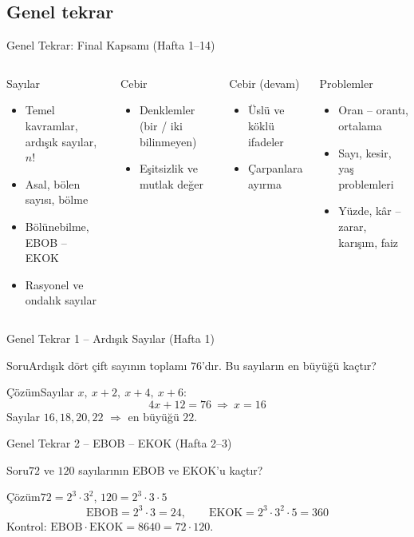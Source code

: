 \documentclass[aspectratio=169,11pt,handout]{beamer}
\newcommand{\soru}[3]{%
\begin{frame}{#1}
  \begin{block}{Soru}\large #2\end{block}
  \pause
  \begin{exampleblock}{Çözüm}\large #3\end{exampleblock}
\end{frame}}
\begin{document}
\subsection{Genel tekrar}
\begin{frame}{Genel Tekrar: Final Kapsamı (Hafta 1--14)}
\begin{columns}[t]
\begin{block}{Sayılar}
\begin{itemize}
\item Temel kavramlar, ardışık sayılar, \(n!\)
\item Asal, bölen sayısı, bölme
\item Bölünebilme, EBOB -- EKOK
\item Rasyonel ve ondalık sayılar
\end{itemize}
\end{block}
\begin{block}{Cebir}
\begin{itemize}
\item Denklemler (bir / iki bilinmeyen)
\item Eşitsizlik ve mutlak değer
\end{itemize}
\end{block}
\begin{block}{Cebir (devam)}
\begin{itemize}
\item Üslü ve köklü ifadeler
\item Çarpanlara ayırma
\end{itemize}
\end{block}
\begin{block}{Problemler}
\begin{itemize}
\item Oran -- orantı, ortalama
\item Sayı, kesir, yaş problemleri
\item Yüzde, kâr -- zarar, karışım, faiz
\end{itemize}
\end{block}
\end{columns}
\end{frame}

\soru{Genel Tekrar 1 -- Ardışık Sayılar (Hafta 1)}
{Ardışık dört çift sayının toplamı \(76\)'dır. Bu sayıların en büyüğü kaçtır?}
{Sayılar \(x,\ x+2,\ x+4,\ x+6\):
\[4x+12=76\ \Rightarrow\ x=16\]
Sayılar \(16,18,20,22\) \(\Rightarrow\) en büyüğü \(22\).}

\soru{Genel Tekrar 2 -- EBOB -- EKOK (Hafta 2--3)}
{\(72\) ve \(120\) sayılarının EBOB ve EKOK'u kaçtır?}
{\(72=2^3\cdot 3^2\), \qquad \(120=2^3\cdot 3\cdot 5\)
\[\text{EBOB}=2^3\cdot 3=24,\qquad \text{EKOK}=2^3\cdot 3^2\cdot 5=360\]
Kontrol: \(\text{EBOB}\cdot\text{EKOK}=8640=72\cdot 120\).}
\end{document}
